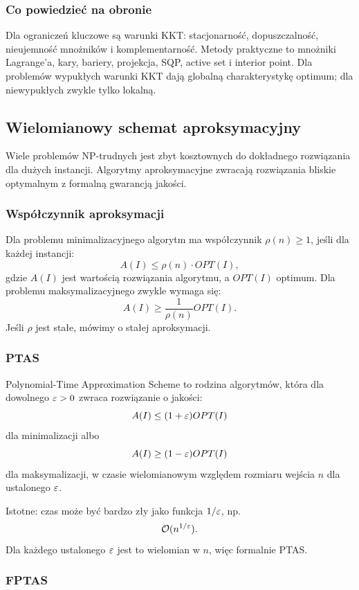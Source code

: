 \subsubsection{Co powiedzieć na obronie}

Dla ograniczeń kluczowe są warunki KKT: stacjonarność, dopuszczalność, nieujemność mnożników i komplementarność. Metody praktyczne to mnożniki Lagrange'a, kary, bariery, projekcja, SQP, active set i interior point. Dla problemów wypukłych warunki KKT dają globalną charakterystykę optimum; dla niewypukłych zwykle tylko lokalną.

\subsection{Wielomianowy schemat aproksymacyjny}

Wiele problemów NP-trudnych jest zbyt kosztownych do dokładnego rozwiązania dla dużych instancji. Algorytmy aproksymacyjne zwracają rozwiązania bliskie optymalnym z formalną gwarancją jakości.

\subsubsection{Współczynnik aproksymacji}

Dla problemu minimalizacyjnego algorytm ma współczynnik $\rho(n)\ge 1$, jeśli dla każdej instancji:
\[
A(I)\le \rho(n)\cdot OPT(I),
\]
gdzie $A(I)$ jest wartością rozwiązania algorytmu, a $OPT(I)$ optimum. Dla problemu maksymalizacyjnego zwykle wymaga się:
\[
A(I)\ge \frac{1}{\rho(n)}OPT(I).
\]
Jeśli $\rho$ jest stałe, mówimy o stałej aproksymacji.

\subsubsection{PTAS}

Polynomial-Time Approximation Scheme to rodzina algorytmów, która dla dowolnego $\varepsilon>0$ zwraca rozwiązanie o jakości:
\[
A(I)\le (1+\varepsilon)OPT(I)
\]
dla minimalizacji albo
\[
A(I)\ge (1-\varepsilon)OPT(I)
\]
dla maksymalizacji, w czasie wielomianowym względem rozmiaru wejścia $n$ dla ustalonego $\varepsilon$.

Istotne: czas może być bardzo zły jako funkcja $1/\varepsilon$, np.
\[
\mathcal{O}(n^{1/\varepsilon}).
\]
Dla każdego ustalonego $\varepsilon$ jest to wielomian w $n$, więc formalnie PTAS.

\subsubsection{FPTAS}

